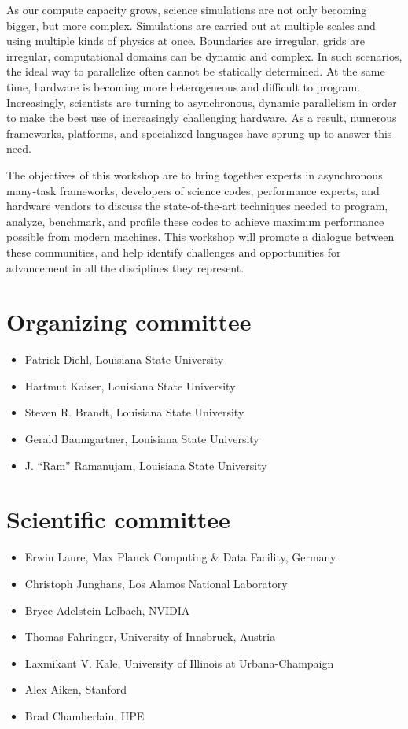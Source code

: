 As our compute capacity grows, science simulations are not only becoming bigger, but more complex. Simulations are carried out at multiple scales and using multiple kinds of physics at once. Boundaries are irregular, grids are irregular, computational domains can be dynamic and complex. In such scenarios, the ideal way to parallelize often cannot be statically determined. At the same time, hardware is becoming more heterogeneous and difficult to program. Increasingly, scientists are turning to asynchronous, dynamic parallelism in order to make the best use of increasingly challenging hardware. As a result, numerous frameworks, platforms, and specialized languages have sprung up to answer this need.

The objectives of this workshop are to bring together experts in asynchronous many-task frameworks, developers of science codes, performance experts, and hardware vendors to discuss the state-of-the-art techniques needed to program, analyze, benchmark, and profile these codes to achieve maximum performance possible from modern machines. This workshop will promote a dialogue between these communities, and help identify challenges and opportunities for advancement in all the disciplines they represent.

\section*{Organizing committee}
\begin{itemize}
\item Patrick Diehl, Louisiana State University
\item Hartmut Kaiser, Louisiana State University
\item Steven R. Brandt, Louisiana State University
\item Gerald Baumgartner, Louisiana State University
\item J. “Ram” Ramanujam,  Louisiana State University
\end{itemize}

\section*{Scientific committee}
\begin{itemize}
\item Erwin Laure, Max Planck Computing \& Data Facility, Germany
\item Christoph Junghans, Los Alamos National Laboratory
\item Bryce Adelstein Lelbach, NVIDIA
\item Thomas Fahringer, University of Innsbruck, Austria
\item Laxmikant V. Kale,  University of Illinois at Urbana-Champaign
\item Alex Aiken, Stanford
\item Brad Chamberlain, HPE
\end{itemize}

